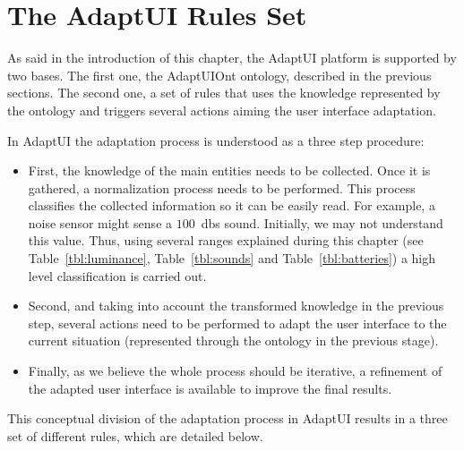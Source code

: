 \section{The AdaptUI Rules Set}
\label{sec:adaptui_rules}

As said in the introduction of this chapter, the AdaptUI platform is supported
by two bases. The first one, the AdaptUIOnt ontology, described in the previous
sections. The second one, a set of rules that uses the knowledge represented
by the ontology and triggers several actions aiming the user interface adaptation.


In AdaptUI the adaptation process is understood as a three step procedure: 

\begin{itemize}
 \item First, the knowledge of the main entities needs to be collected. Once it
 is gathered, a normalization process needs to be performed. This process classifies
 the collected information so it can be easily read. For example, a noise sensor
 might sense a $100$~\acp{db} sound. Initially, we may not understand this value. Thus,
 using several ranges explained during this chapter (see Table~\ref{tbl:luminance},
 Table~\ref{tbl:sounds} and Table~\ref{tbl:batteries}) a high level classification
 is carried out.
 
 \item Second, and taking into account the transformed knowledge in the previous
 step, several actions need to be performed to adapt the user interface to the
 current situation (represented through the ontology in the previous stage).
 
 \item Finally, as we believe the whole process should be iterative, a refinement
 of the adapted user interface is available to improve the final results.
\end{itemize}

This conceptual division of the adaptation process in AdaptUI results in a three
set of different rules, which are detailed below.

